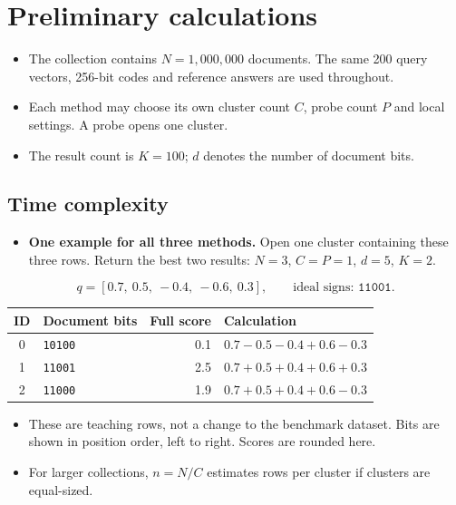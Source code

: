 \newpage
\section{Preliminary calculations}
\begin{itemize}
\item The collection contains $N=1{,}000{,}000$ documents. The same 200 query vectors, 256-bit codes and reference answers are used throughout.
\item Each method may choose its own cluster count $C$, probe count $P$ and local settings. A probe opens one cluster.
\item The result count is $K=100$; $d$ denotes the number of document bits.
\end{itemize}

\subsection{Time complexity}
\begin{itemize}
\item \textbf{One example for all three methods.} Open one cluster containing these three rows. Return the best two results: $N=3$, $C=P=1$, $d=5$, $K=2$.
\end{itemize}
\[
 q=[0.7,\ 0.5,\ -0.4,\ -0.6,\ 0.3],\qquad\text{ideal signs: }\texttt{11001}.
\]
\begin{center}
\begin{tabular}{@{}clrl@{}}\toprule
ID & Document bits & Full score & Calculation\\\midrule
0 & \texttt{10100} & 0.1 & $0.7-0.5-0.4+0.6-0.3$\\
1 & \texttt{11001} & 2.5 & $0.7+0.5+0.4+0.6+0.3$\\
2 & \texttt{11000} & 1.9 & $0.7+0.5+0.4+0.6-0.3$\\\bottomrule
\end{tabular}
\end{center}
\begin{itemize}
\item These are teaching rows, not a change to the benchmark dataset. Bits are shown in position order, left to right. Scores are rounded here.
\item For larger collections, $n=N/C$ estimates rows per cluster if clusters are equal-sized.
\end{itemize}

